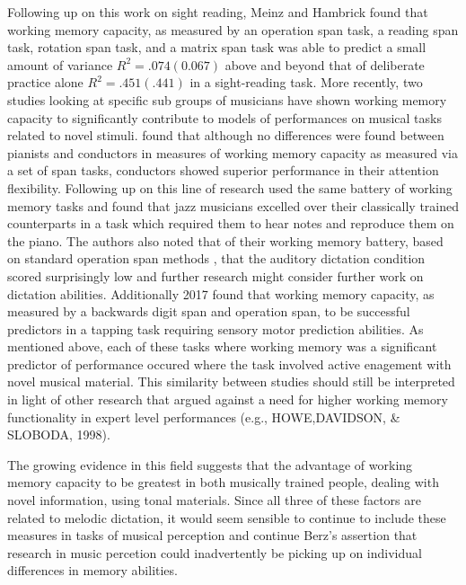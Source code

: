 \documentclass[]{book}
\theoremstyle{definition}
\theoremstyle{definition}
\theoremstyle{definition}
\theoremstyle{remark}
\begin{document}
Following up on this work on sight reading, Meinz and Hambrick found
that working memory capacity, as measured by an operation span task, a
reading span task, rotation span task, and a matrix span task was able
to predict a small amount of variance \(R^2=.074(0.067)\) above and
beyond that of deliberate practice alone \(R^2=.451(.441)\) in a
sight-reading task. More recently, two studies looking at specific sub
groups of musicians have shown working memory capacity to significantly
contribute to models of performances on musical tasks related to novel
stimuli. \citep{wollnerAttentionalFlexibilityMemory2016} found that
although no differences were found between pianists and conductors in
measures of working memory capacity as measured via a set of span tasks,
conductors showed superior performance in their attention flexibility.
Following up on this line of research \citep{nicholsScoreOneJazz2018}
used the same battery of working memory tasks and found that jazz
musicians excelled over their classically trained counterparts in a task
which required them to hear notes and reproduce them on the piano. The
authors also noted that of their working memory battery, based on
standard operation span methods \citep{engleWorkingMemoryCapacity2002},
that the auditory dictation condition scored surprisingly low and
further research might consider further work on dictation abilities.
Additionally \citep{colleyWorkingMemoryAuditory2018} 2017 found that
working memory capacity, as measured by a backwards digit span and
operation span, to be successful predictors in a tapping task requiring
sensory motor prediction abilities. As mentioned above, each of these
tasks where working memory was a significant predictor of performance
occured where the task involved active enagement with novel musical
material. This similarity between studies should still be interpreted in
light of other research that argued against a need for higher working
memory functionality in expert level performances (e.g., HOWE,DAVIDSON,
\& SLOBODA, 1998).

The growing evidence in this field suggests that the advantage of
working memory capacity to be greatest in both musically trained people,
dealing with novel information, using tonal materials. Since all three
of these factors are related to melodic dictation, it would seem
sensible to continue to include these measures in tasks of musical
perception and continue Berz's assertion that research in music
percetion could inadvertently be picking up on individual differences in
memory abilities.
\end{document}
